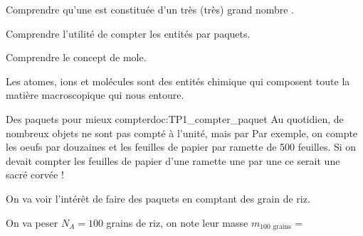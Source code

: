 \teteSndMole

\vspace*{-32pt}


\begin{objectifs}
  \item Comprendre qu'une  est constituée d'un très (très) grand nombre .
  \item Comprendre l'utilité de compter les entités par paquets.
  \item Comprendre le concept de mole.
\end{objectifs}

\begin{contexte}  
  Les atomes, ions et molécules sont des entités chimique qui composent toute la matière macroscopique qui nous entoure.
  
\end{contexte}



\begin{doc}{Des paquets pour mieux compter}{doc:TP1_compter_paquet}
  Au quotidien, de nombreux objets ne sont pas compté à l'unité, mais par 
  Par exemple, on compte les oeufs par douzaines et les feuilles de papier par ramette de 500 feuilles.
  Si on devait compter les feuilles de papier d'une ramette une par une ce serait une sacré corvée !

  On va voir l'intérêt de faire des paquets en comptant des grain de riz.
\end{doc}

\mesure On va peser $N_A = 100$ grains de riz, on note leur masse $m_\text{100 grains}$ = 






